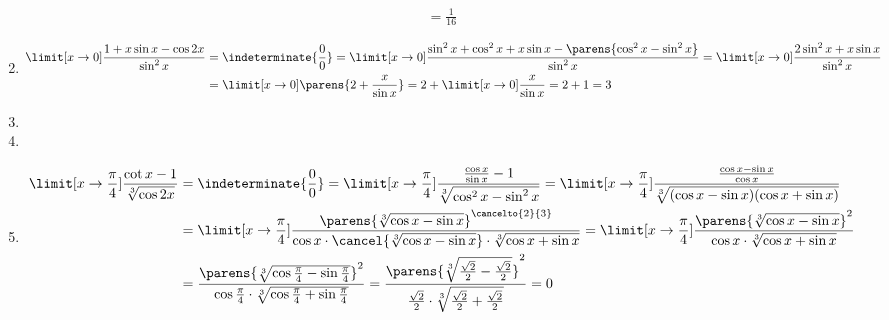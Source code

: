 \begin{enumerate}[label={\alph*)}]
\begin{equation*}
\begin{split}
                    = \frac{1}{16}
            \end{split}
        \end{equation*}
    \item
        \begin{equation*}
            \begin{split}
                \limit[x \to 0] \frac{1 + x\sin{x} - \cos{2x}}{\sin^2{x}}
                    &= \indeterminate{\frac{0}{0}}
                    = \limit[x \to 0] \frac{\sin^2{x} + \cos^2{x} + x\sin{x} - \parens{\cos^2{x} - \sin^2{x}}}{\sin^2{x}}
                    = \limit[x \to 0] \frac{2\sin^2{x} + x\sin{x}}{\sin^2{x}}\\
                    &= \limit[x \to 0] \parens{2 + \frac{x}{\sin{x}}}
                    = 2 + \limit[x \to 0] \frac{x}{\sin{x}}
                    = 2 + 1
                    = 3
            \end{split}
        \end{equation*}
    \item
    \item
    \item
        \begin{equation*}
            \begin{split}
                \limit[x \to \frac{\pi}{4}] \frac{\cot{x} - 1}{\sqrt[3]{\cos{2x}}}
                    &= \indeterminate{\frac{0}{0}}
                    = \limit[x \to \frac{\pi}{4}] \frac{\frac{\cos{x}}{\sin{x}} - 1}{\sqrt[3]{\cos^2{x} - \sin^2{x}}}
                    = \limit[x \to \frac{\pi}{4}] \frac{\frac{\cos{x} - \sin{x}}{\cos{x}}}{\sqrt[3]{(\cos{x} - \sin{x})(\cos{x} + \sin{x})}}\\
                    &= \limit[x \to \frac{\pi}{4}] \frac{\parens{\sqrt[3]{\cos{x} - \sin{x}}}^{\cancelto{2}{3}}}{\cos{x} \cdot \cancel{\sqrt[3]{\cos{x} - \sin{x}}} \cdot \sqrt[3]{\cos{x} + \sin{x}}}
                    = \limit[x \to \frac{\pi}{4}] \frac{\parens{\sqrt[3]{\cos{x} - \sin{x}}}^2}{\cos{x} \cdot \sqrt[3]{\cos{x} + \sin{x}}}\\
                    &= \frac{\parens{\sqrt[3]{\cos{\frac{\pi}{4}} - \sin{\frac{\pi}{4}}}}^2}{\cos{\frac{\pi}{4}} \cdot \sqrt[3]{\cos{\frac{\pi}{4}} + \sin{\frac{\pi}{4}}}}
                    = \frac{\parens{\sqrt[3]{\frac{\sqrt{2}}{2} - \frac{\sqrt{2}}{{2}}}}^2}{\frac{\sqrt{2}}{2} \cdot \sqrt[3]{\frac{\sqrt{2}}{2} + \frac{\sqrt{2}}{2}}}
                    = 0
            \end{split}
        \end{equation*}

\end{enumerate}
